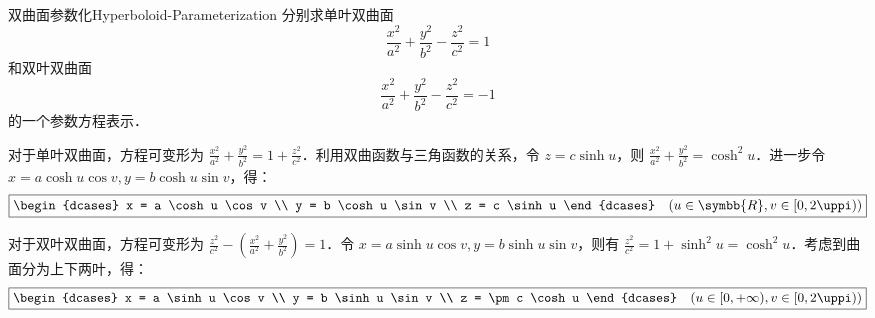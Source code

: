 \begin{problem}{双曲面参数化}{Hyperboloid-Parameterization}
    分别求单叶双曲面
    \begin{equation}
        \frac{x^2}{a^2} + \frac{y^2}{b^2} - \frac{z^2}{c^2} = 1
    \end{equation}
    和双叶双曲面
    \begin{equation}
        \frac{x^2}{a^2} + \frac{y^2}{b^2} - \frac{z^2}{c^2} = -1
    \end{equation}
    的一个参数方程表示．
\end{problem}

\begin{solution}

    对于单叶双曲面，方程可变形为 $\frac{x^2}{a^2} + \frac{y^2}{b^2} = 1 + \frac{z^2}{c^2}$．利用双曲函数与三角函数的关系，令 $z = c \sinh u$，则 $\frac{x^2}{a^2} + \frac{y^2}{b^2} = \cosh^2 u$．进一步令 $x = a \cosh u \cos v, y = b \cosh u \sin v$，得：
    \begin{equation}
        \boxed{\begin{dcases} x = a \cosh u \cos v \\ y = b \cosh u \sin v \\ z = c \sinh u \end{dcases} \quad (u \in \symbb{R}, v \in [0, 2\uppi))}
    \end{equation}


    对于双叶双曲面，方程可变形为 $\frac{z^2}{c^2} - \left( \frac{x^2}{a^2} + \frac{y^2}{b^2} \right) = 1$．令 $x = a \sinh u \cos v, y = b \sinh u \sin v$，则有 $\frac{z^2}{c^2} = 1 + \sinh^2 u = \cosh^2 u$．考虑到曲面分为上下两叶，得：
    \begin{equation}
        \boxed{\begin{dcases} x = a \sinh u \cos v \\ y = b \sinh u \sin v \\ z = \pm c \cosh u \end{dcases} \quad (u \in [0, +\infty), v \in [0, 2\uppi))}
    \end{equation}
\end{solution}

\endinput
